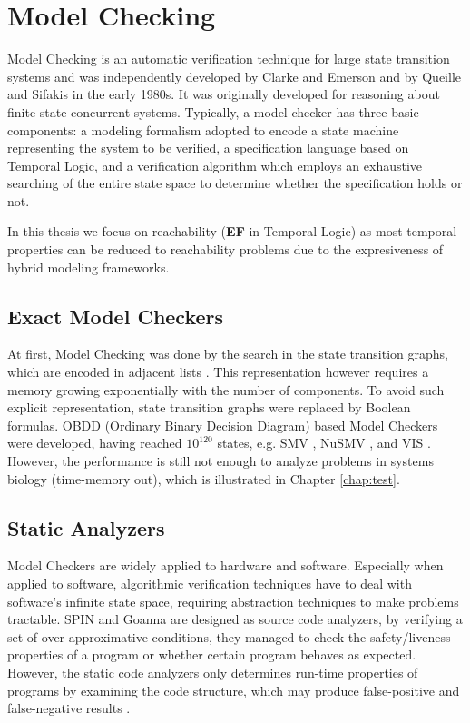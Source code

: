 \section{Model Checking}
Model Checking is an automatic verification technique for large state transition systems and was independently developed by Clarke and Emerson \cite{clarke1981design} and by Queille and Sifakis \cite{queille1982specification} in the early 1980s. It was originally developed for reasoning about finite-state concurrent systems.
Typically, a model checker has three basic components: a modeling formalism adopted to encode a state machine representing the system to be verified, a specification language based on Temporal Logic, and a verification algorithm \cite{clarke20142} which employs an exhaustive searching of the entire state space to determine whether the specification holds or not.

In this thesis we focus on reachability (\textbf{EF} in Temporal Logic) as most temporal properties can be reduced to reachability problems due to the expresiveness of hybrid modeling frameworks.

\subsection{Exact Model Checkers}
At first, Model Checking was done by the search in the state transition graphs, which are encoded in adjacent lists \cite{clarke1981design}.
This representation however requires a memory growing exponentially with the number of components.
To avoid such explicit representation, state transition graphs were replaced by Boolean formulas.
OBDD (Ordinary Binary Decision Diagram) based Model Checkers were developed, having reached $10^{120}$ states, e.g.
SMV \cite{mcmillan1993symbolic}, NuSMV \cite{cimatti2000nusmv}, and VIS \cite{brayton1996vis}.
However, the performance is still not enough to analyze problems in systems biology (time-memory out), which is illustrated in Chapter \ref{chap:test}.  

\subsection{Static Analyzers}
Model Checkers are widely applied to hardware and software.
Especially when applied to software, algorithmic verification techniques have
to deal with software’s infinite state space, requiring abstraction techniques to make problems tractable.
SPIN \cite{holzmann1997model} and Goanna \cite{fehnker2006goanna} are designed as source code analyzers, by verifying a set of over-approximative conditions, they managed to check the safety/liveness properties of a program or whether certain program behaves as expected. 
However, the static code analyzers only determines run-time properties of programs by examining the code structure, which may produce false-positive and false-negative results \cite{vorobyov2010comparing}.

